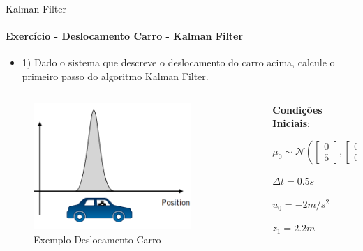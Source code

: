 \documentclass[aspectratio=169]{beamer}
\begin{document}
\begin{frame}[c]{Kalman Filter}
    \framesubtitle{Exercício - Deslocamento Carro - Kalman Filter}
    
    \begin{itemize}
        \item 1) Dado o sistema que descreve o deslocamento do carro acima,
        calcule o primeiro passo do algoritmo Kalman Filter.
    \end{itemize}

    \begin{columns}
        \begin{column}[c]{0.4\textwidth}
            \begin{figure}
                \centering
                \includegraphics[width=0.8\textwidth]{./images/kalman_car.png}
                \caption{Exemplo Deslocamento Carro}
            \end{figure}
            
        \end{column}
        \begin{column}[c]{0.6\textwidth}
            
            \textbf{Condições Iniciais}:

            \begin{equation*}
                \mu_0 \sim \mathcal{N} \left( 
                    \begin{bmatrix}
                        0 \\ 5
                    \end{bmatrix}, 
                    \begin{bmatrix}
                        0.01 & 0 \\
                        0 & 1
                    \end{bmatrix} \right)
            \end{equation*}

            $\Delta t = 0.5s$

            $u_0 = -2m/s^2$

           $z_1 = 2.2 m$ 

        \end{column}
    \end{columns}
\end{frame}
\end{document}
